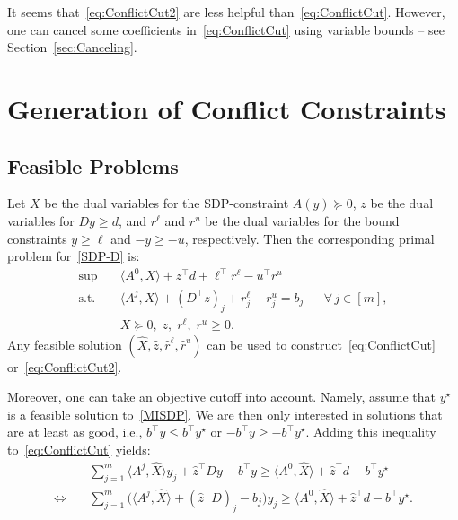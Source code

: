 \documentclass[10pt, a4paper]{article}
\newcommand{\skal}[2]{\langle{#1},{#2}\rangle}
\newcommand{\T}{^{\top}}
\begin{document}
It seems that~\eqref{eq:ConflictCut2} are less helpful
than~\eqref{eq:ConflictCut}. However, one can cancel some coefficients
in~\eqref{eq:ConflictCut} using variable bounds -- see
Section~\ref{sec:Canceling}.


\section{Generation of Conflict Constraints}

\subsection{Feasible Problems}

Let $X$ be the dual variables for the SDP-constraint $A(y) \succeq 0$, $z$
be the dual variables for $Dy \geq d$, and $r^\ell$ and $r^u$ be the dual
variables for the bound constraints $y \geq \ell$ and $-y \geq -u$,
respectively. Then the corresponding primal problem for~\eqref{SDP-D} is:
\begin{equation}\label{SDP-P}
  \begin{aligned}
     \sup \quad & \skal{A^0}{X} + z\T d + \ell\T r^\ell - u\T r^u\\
     \text{s.t.} \quad & \skal{A^j}{X} + (D\T z)_j + r^\ell_j - r^u_j = b_j && \forall \, j \in [m],\\
     & X \succeq 0,\; z, \; r^\ell,\; r^u \geq 0.
  \end{aligned}
\end{equation}
Any feasible solution $(\hat{X}, \hat{z}, \hat{r}^\ell, \hat{r}^u)$ can be
used to construct~\eqref{eq:ConflictCut} or~\eqref{eq:ConflictCut2}.

Moreover, one can take an objective cutoff into account. Namely, assume
that $y^\star$ is a feasible solution to~\eqref{MISDP}. We are then only
interested in solutions that are at least as good, i.e.,
$b\T y \leq b\T y^\star$ or $- b\T y \geq - b\T y^\star$. Adding this
inequality to~\eqref{eq:ConflictCut} yields:
\begin{align*}
  & \sum_{j=1}^m \skal{A^j}{\hat{X}} y_j + \hat{z}\T D y - b\T y \geq
    \skal{A^0}{\hat{X}} + \hat{z}\T d - b\T y^\star\\
  \Leftrightarrow\quad
  & \sum_{j=1}^m \big(\skal{A^j}{\hat{X}} + (\hat{z}\T D)_j - b_j\big) y_j \geq
    \skal{A^0}{\hat{X}} + \hat{z}\T d - b\T y^\star.
\end{align*}
\end{document}
